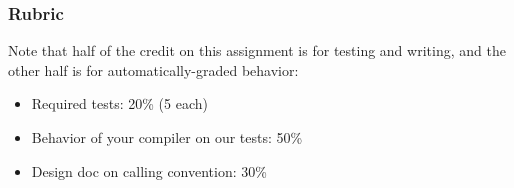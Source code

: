 \documentclass[10pt, oneside]{article}
\begin{document}
\subsubsection*{Rubric}

Note that half of the credit on this assignment is for testing and writing,
and the other half is for automatically-graded behavior:

\begin{itemize}
\item Required tests: 20\% (5 each)
\item Behavior of your compiler on our tests: 50\%
\item Design doc on calling convention: 30\%
\end{itemize}
\end{document}
